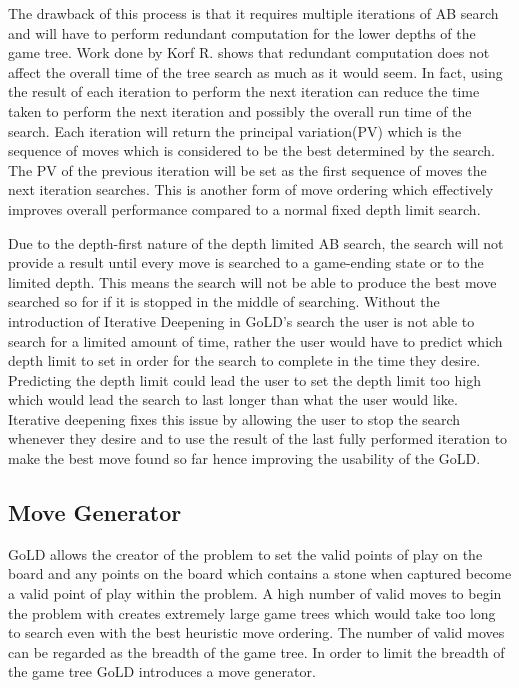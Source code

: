 \documentclass{l4proj}
\begin{document}
The drawback of this process is that it requires multiple iterations of AB search and will have to perform redundant computation for the lower depths of the game tree. Work done by Korf R. \cite{Korf1985} shows that redundant computation does not affect the overall time of the tree search as much as it would seem. In fact, using the result of each iteration to perform the next iteration can reduce the time taken to perform the next iteration and possibly the overall run time of the search. Each iteration will return the principal variation(PV) which is the sequence of moves which is considered to be the best determined by the search. The PV of the previous iteration will be set as the first sequence of moves the next iteration searches. This is another form of move ordering which effectively improves overall performance compared to a normal fixed depth limit search.

Due to the depth-first nature of the depth limited AB search, the search will not provide a result until every move is searched to a game-ending state or to the limited depth. This means the search will not be able to produce the best move searched so for if it is stopped in the middle of searching. Without the introduction of Iterative Deepening in GoLD’s search the user is not able to search for a limited amount of time, rather the user would have to predict which depth limit to set in order for the search to complete in the time they desire.  Predicting the depth limit could lead the user to set the depth limit too high which would lead the search to last longer than what the user would like. Iterative deepening fixes this issue by allowing the user to stop the search whenever they desire and to use the result of the last fully performed iteration to make the best move found so far hence improving the usability of the GoLD.


\subsection{Move Generator}
GoLD allows the creator of the problem to set the valid points of play on the board and any points on the board which contains a stone when captured become a valid point of play within the problem. A high number of valid moves to begin the problem with creates extremely large game trees which would take too long to search even with the best heuristic move ordering. The number of valid moves can be regarded as the breadth of the game tree. In order to limit the breadth of the game tree GoLD introduces a move generator.
\end{document}
